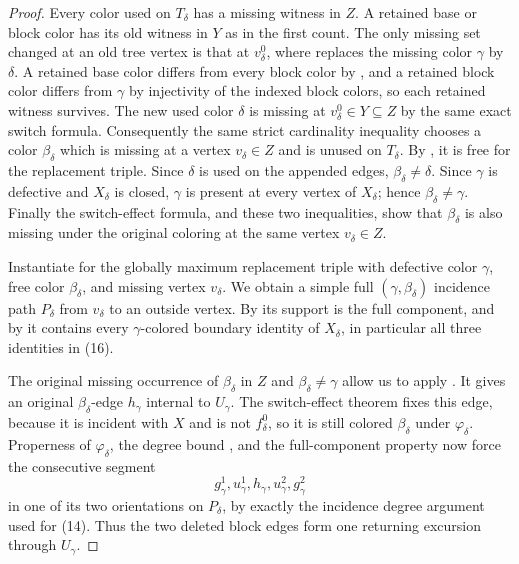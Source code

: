 \begin{proof}
Every color used on $T_\delta$ has a missing witness in $Z$.  A retained
base or block color has its old witness in $Y$ as in the first count.  The
only missing set changed at an old tree vertex is that at
$v^0_\delta$, where  replaces the
missing color $\gamma$ by $\delta$.  A retained base color differs from
every block color by , and a
retained block color differs from $\gamma$ by injectivity of the indexed
block colors, so each retained witness survives.  The new used color
$\delta$ is missing at $v^0_\delta\in Y\subseteq Z$ by the same exact
switch formula.  Consequently the same strict cardinality inequality
chooses a color $\beta_\delta$ which is missing at a vertex $v_\delta\in Z$
and is unused on $T_\delta$.  By , it is free for
the replacement triple.  Since $\delta$ is used on the appended edges,
$\beta_\delta\ne\delta$.  Since $\gamma$ is defective and
$X_\delta$ is closed, $\gamma$ is present at every vertex of
$X_\delta$; hence $\beta_\delta\ne\gamma$.  Finally the switch-effect
formula, and these two inequalities, show that
$\beta_\delta$ is also missing under the original coloring at the same
vertex $v_\delta\in Z$.

Instantiate  for the globally
maximum replacement triple with defective color $\gamma$, free color
$\beta_\delta$, and missing vertex $v_\delta$.  We obtain a simple full
$(\gamma,\beta_\delta)$ incidence path $P_\delta$ from $v_\delta$ to an
outside vertex.  By  its support is
the full component, and by
 it contains every
$\gamma$-colored boundary identity of $X_\delta$, in particular all three
identities in (16).

The original missing occurrence of $\beta_\delta$ in $Z$ and
$\beta_\delta\ne\gamma$ allow us to apply
.  It gives an original
$\beta_\delta$-edge $h_\gamma$ internal to $U_\gamma$.
The switch-effect theorem fixes this edge, because it is incident with
$X$ and is not $f^0_\delta$, so it is still colored $\beta_\delta$ under
$\varphi_\delta$.  Properness of $\varphi_\delta$, the degree bound
, and the full-component
property now force the consecutive segment
\[
 g^1_\gamma, u^1_\gamma, h_\gamma,
 u^2_\gamma, g^2_\gamma \tag{17}
\]
in one of its two orientations on $P_\delta$, by exactly the incidence
degree argument used for (14).  Thus the two deleted block edges form one
returning excursion through $U_\gamma$.


\end{proof}
